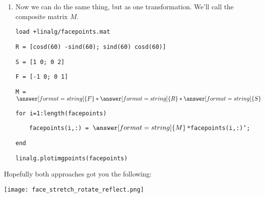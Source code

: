 \documentclass{ximera}
\begin{document}
\begin{exploration}
\begin{example}
\begin{enumerate}
            \texttt{        face\textunderscore points(i,:)=}$\answer[format=string]{F}$\texttt{*face\textunderscore points(i,:)';}

            \texttt{end}

            \texttt{linalg.plot\textunderscore img\textunderscore points(face\textunderscore points)}

            \item Now we can do the same thing, but as one transformation. We'll call the composite matrix $M$.
            
            \vspace{1cm}
            
            \texttt{load +linalg/face\textunderscore points.mat}

            \texttt{R = [cosd(60) -sind(60); sind(60) cosd(60)]}

            \texttt{S = [1 0; 0 2]}

            \texttt{F = [-1 0; 0 1]}

            \texttt{M = }$\answer[format=string]{F}*\answer[format=string]{R}*\answer[format=string]{S}$

            \texttt{for i=1:length(face\textunderscore points)}

            $\qquad $\texttt{face\textunderscore points(i,:) = }$\answer[format=string]{M}$\texttt{*face\textunderscore points(i,:)';}

            \texttt{end}

            \texttt{linalg.plot\textunderscore img\textunderscore points(face\textunderscore points)}

        \end{enumerate}

        Hopefully both approaches got you the following:

        \begin{center}
            \texttt{[image: face\_stretch\_rotate\_reflect.png]}
        \end{center}

    \end{example}

\end{exploration}
\end{document}

